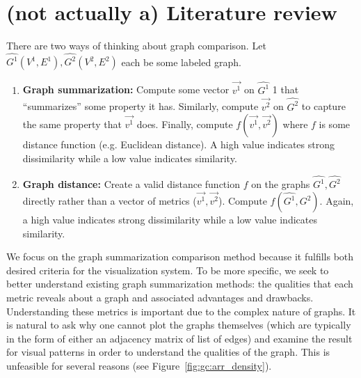 \section{(not actually a) Literature review}
\label{sec:gc:litreview}

There are two ways of thinking about graph comparison. Let $\hat{G^1}(V^1,E^1), 
\hat{G^2}(V^2,E^2)$ each be some labeled graph. 

\tablespacing
\begin{enumerate}
	\item \textbf{Graph summarization:} Compute some vector 
	$\overrightarrow{v^1}$ on $\hat{G^1}$ 1 that ``summarizes'' some property 
	it has. Similarly, compute $\overrightarrow{v^2}$ on $\hat{G^2}$ to capture 
	the same property that $\overrightarrow{v^1}$ does. Finally, compute 
	$f(\overrightarrow{v^1},\overrightarrow{v^2})$ where $f$ is some distance 
	function (e.g. Euclidean distance). A high value indicates strong 
	dissimilarity while a low value indicates similarity. 
	
	\item \textbf{Graph distance:} Create a valid distance function $f$ on the 
	graphs $\hat{G^1}, \hat{G^2}$ directly rather than a vector of metrics 
	($\overrightarrow{v^1},\overrightarrow{v^2}$). 
	Compute $f(\hat{G^1},\hat{G^2})$. Again, a high value indicates strong 
	dissimilarity while a low value indicates similarity. 
\end{enumerate}
\bodyspacing

We focus on the graph summarization comparison method because it fulfills both 
desired criteria for the visualization system. To be more specific, we seek to 
better understand existing graph summarization methods: the qualities that each 
metric reveals about a graph and associated advantages and drawbacks. 
Understanding these metrics is important due to the complex nature of graphs.
It is natural to ask why one cannot plot the graphs themselves (which are 
typically in the form of either an adjacency matrix of list of edges) and 
examine the result for visual patterns in order to understand the qualities 
of the graph. This is unfeasible for several reasons (see 
Figure~\ref{fig:gc:arr_density}). 

